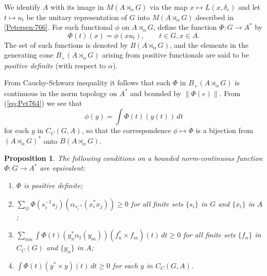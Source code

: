 \documentclass{book}
\newtheorem{proposition}[definition]{Proposition}
\begin{document}
We identify \(A\) with its image in \(M(A\rtimes_\alpha G)\) via the map \(x\mapsto L(x,\delta_e)\)
and let \(t\mapsto u_t\) be the unitary representation of \(G\) into \(M(A\rtimes_\alpha G)\) described in \ref{Petersen:766}.
For each functional \(\phi\) on \(A\rtimes_\alpha G\), define the function \(\Phi:G\rightarrow A^*\) by
\begin{equation}\label{Petersen:767}
  \Phi(t)(x)=\phi(x u_t),\qquad t\in G, x\in A.
\end{equation}
The set of such functions is denoted by \(B(A\rtimes_\alpha G)\), and the elements in the generating cone 
\(B_+(A\rtimes_\alpha G)\) arising from positive functionals are said to be \textit{positive definite} (with respect to \(\alpha\)).\par
From Cauchy-Schwarz inequality it follows that each \(\Phi\) in \(B_+(A\rtimes_\alpha G)\) is continuous in the norm topology
on \(A^*\) and bounded by \(\left\|\Phi(e)\right\|\). From (\ref{eq:Pet764}) we see that
\[
  \phi(y)=\int\Phi(t)(y(t))\,dt
\]
for each \(y\) in \(C_C(G,A)\), so that the correspondence \(\phi\mapsto \Phi\) is a bijection from
\(
  {(A\rtimes_\alpha G)}^*
\)
onto \(B(A\rtimes_\alpha G)\).
\begin{proposition}\label{Petersen:768}
  The following conditions on a bounded norm-continuous function \(\Phi:G\rightarrow A^*\) are equivalent:
  \begin{enumerate}
    \item \(\Phi\) is positive definite;
    \item \(\sum_{ij}\Phi(s_i^{-1}s_j)(\alpha_{s_i^{-1}}(x_i^* x_j))\geq 0\) for all finite sets \(\{s_i\}\) in \(G\) and \(\{x_i\}\) in \(A\);
    \item \(\sum_{nm}\int\Phi(t)(y_n^*\alpha_t(y_m))(f^*_n\times f_m)(t)\,dt\geq 0\) for all finite sets \(\{f_n\}\) in \(C_C(G)\) and \(\{y_n\}\) in \(A\);
    \item \(\int\Phi(t)(y^*\times y)(t)\,dt\geq 0\) for each \(y\) in \(C_C(G,A)\).
  \end{enumerate}
\end{proposition}
\end{document}
